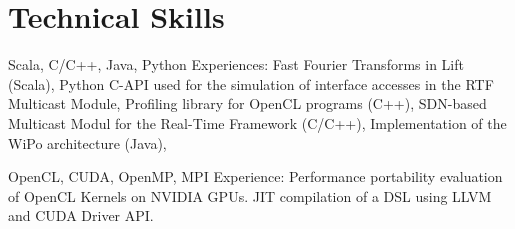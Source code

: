 \documentclass[11pt,a4paper,sans]{moderncv}        %
\begin{document}

\section{Technical Skills}
					{Scala, C/C++, Java, Python}{}{}{}
					{Experiences:
					 Fast Fourier Transforms in Lift (Scala),
           Python C-API used for the simulation of interface accesses in the RTF Multicast Module,
					 Profiling library for OpenCL programs (C++),
				 	 SDN-based Multicast Modul for the Real-Time Framework (C/C++),
					 Implementation of the WiPo architecture (Java),
					}

					{OpenCL, CUDA, OpenMP, MPI}{}{}{}
					{Experience:
					 Performance portability evaluation of OpenCL Kernels on NVIDIA GPUs. JIT compilation of a DSL using LLVM and CUDA Driver API.
					}

\cvline{}{}{}
\cvline{}{}{}
\cvline{}{}{}
 
\end{document}
